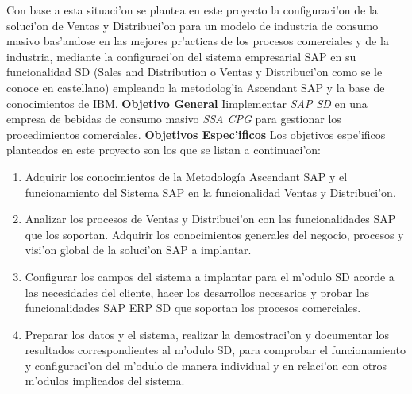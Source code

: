 		Con base a esta situaci'on se plantea en este proyecto la configuraci'on de la soluci'on de Ventas y Distribuci'on para un modelo de industria de consumo masivo bas'andose en las mejores pr'acticas de los procesos comerciales y de la industria, mediante la configuraci'on del sistema empresarial SAP en su funcionalidad SD (Sales and Distribution o Ventas y Distribuci'on como se le conoce en castellano) empleando la metodolog'ia Ascendant SAP y la base de conocimientos de IBM.
\newline
\newline
\label{sect:objetivo_general}
\newline
\textbf{Objetivo General}
\newline
\newline
\indent Iimplementar \emph{SAP SD} en una empresa de bebidas de consumo masivo \emph{SSA CPG} para gestionar los procedimientos comerciales. 
\newline
\newline
\label{sect:objetivos_especificos}
\textbf{Objetivos Espec'ificos}
\newline
\newline
 Los objetivos espe'ificos planteados en este proyecto son los que se listan a continuaci'on:
\begin{enumerate}
\item Adquirir los conocimientos de la Metodología Ascendant SAP y el funcionamiento del Sistema SAP en la funcionalidad Ventas y Distribuci'on.

\item Analizar los procesos de Ventas y Distribuci'on con las funcionalidades SAP que los soportan. Adquirir los conocimientos generales del negocio, procesos y visi'on global de la soluci'on SAP a implantar.

\item Configurar los campos del sistema a implantar para el m'odulo SD acorde a las necesidades del cliente, hacer los desarrollos necesarios y probar las funcionalidades SAP ERP SD que soportan los procesos comerciales.

\item Preparar los datos y el sistema, realizar la demostraci'on y documentar los resultados correspondientes al m'odulo SD, para comprobar el funcionamiento y configuraci'on del m'odulo de manera individual y en relaci'on con otros m'odulos implicados del sistema.

\end{enumerate}




